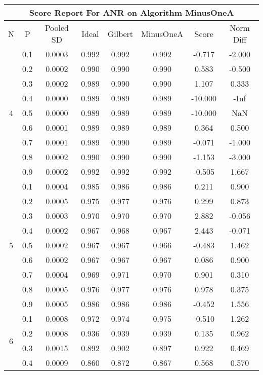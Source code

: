 \documentclass[11pt,a4paper]{report}
\begin{document}
\begin{longtable}{ | c | c || c | c | c | c | c | c | }
\hline
\multicolumn{8}{|c|}{ Score Report For ANR on Algorithm MinusOneA} \\
\hline
N & P & Pooled SD &  Ideal &  Gilbert & MinusOneA  & Score & Norm Diff \\
 \hline
 \hline
 \endhead
\multirow{9}{*}{4} & 0.1 & 0.0003 & 0.992 & 0.992 & 0.992 & -0.717 & -2.000 \\
 & 0.2 & 0.0002 & 0.990 & 0.990 & 0.990 & 0.583 & -0.500 \\
 & 0.3 & 0.0002 & 0.989 & 0.990 & 0.990 & 1.107 & 0.333 \\
 & 0.4 & 0.0000 & 0.989 & 0.989 & 0.989 & -10.000 & -Inf \\
 & 0.5 & 0.0000 & 0.989 & 0.989 & 0.989 & -10.000 & NaN \\
 & 0.6 & 0.0001 & 0.989 & 0.989 & 0.989 & 0.364 & 0.500 \\
 & 0.7 & 0.0001 & 0.989 & 0.990 & 0.989 & -0.071 & -1.000 \\
 & 0.8 & 0.0002 & 0.990 & 0.990 & 0.990 & -1.153 & -3.000 \\
 & 0.9 & 0.0002 & 0.992 & 0.992 & 0.992 & -0.505 & 1.667 \\
 \hline
\multirow{9}{*}{5} & 0.1 & 0.0004 & 0.985 & 0.986 & 0.986 & 0.211 & 0.900 \\
 & 0.2 & 0.0005 & 0.975 & 0.977 & 0.976 & 0.299 & 0.873 \\
 & 0.3 & 0.0003 & 0.970 & 0.970 & 0.970 & 2.882 & -0.056 \\
 & 0.4 & 0.0002 & 0.967 & 0.968 & 0.967 & 2.443 & -0.071 \\
 & 0.5 & 0.0002 & 0.967 & 0.967 & 0.966 & -0.483 & 1.462 \\
 & 0.6 & 0.0002 & 0.967 & 0.967 & 0.967 & 0.086 & 0.900 \\
 & 0.7 & 0.0004 & 0.969 & 0.971 & 0.970 & 0.901 & 0.310 \\
 & 0.8 & 0.0005 & 0.976 & 0.977 & 0.976 & 0.978 & 0.375 \\
 & 0.9 & 0.0005 & 0.986 & 0.986 & 0.986 & -0.452 & 1.556 \\
 \hline
\multirow{9}{*}{6} & 0.1 & 0.0008 & 0.972 & 0.974 & 0.975 & -0.510 & 1.262 \\
 & 0.2 & 0.0008 & 0.936 & 0.939 & 0.939 & 0.135 & 0.962 \\
 & 0.3 & 0.0015 & 0.892 & 0.902 & 0.897 & 0.922 & 0.469 \\
 & 0.4 & 0.0009 & 0.860 & 0.872 & 0.867 & 0.568 & 0.570 \\

\end{longtable}
\end{document}
